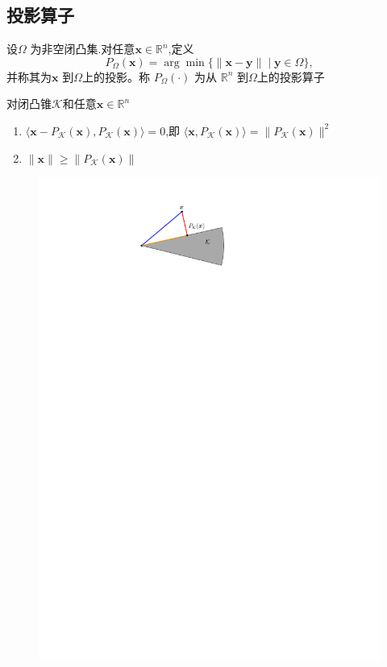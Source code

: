 \subsection{投影算子}
\begin{definition}[投影算子]
    设$\Omega$ 为非空闭凸集.对任意$\boldsymbol{x}\in\mathbb{R}^n$,定义
    \[
        P_\Omega(\boldsymbol{x})=\arg\min\{\|\boldsymbol{x}-\boldsymbol{y}\|\mid\boldsymbol{y}\in\Omega\},
    \]并称其为$\boldsymbol{x}$ 到$\Omega$上的投影。称 $P_\Omega(\cdot)$ 为从 $\mathbb{R}^n$ 到$\Omega$上的投影算子
\end{definition}
\begin{theorem}
    对闭凸锥$\mathcal{K}$和任意$\boldsymbol{x}\in\mathbb{R}^{n}$
    \begin{enumerate}
        \item $\langle \boldsymbol{x}- P_{\mathcal{K} }( \boldsymbol{x}) , P_{\mathcal{K} }( \boldsymbol{x}) \rangle = 0$,即 $\langle \boldsymbol{x}, P_{\mathcal{K} }( \boldsymbol{x}) \rangle = \| P_{\mathcal{K} }( \boldsymbol{x}) \| ^{2}$
        \item $\parallel \boldsymbol{x}\parallel\geqslant\parallel P_{\mathcal{K}}(\boldsymbol{x})\parallel$
    \end{enumerate}
    \begin{figure}[ht]
        \centering
        \includegraphics{image/闭凸锥上的投影.pdf}
    \end{figure}
\end{theorem}
